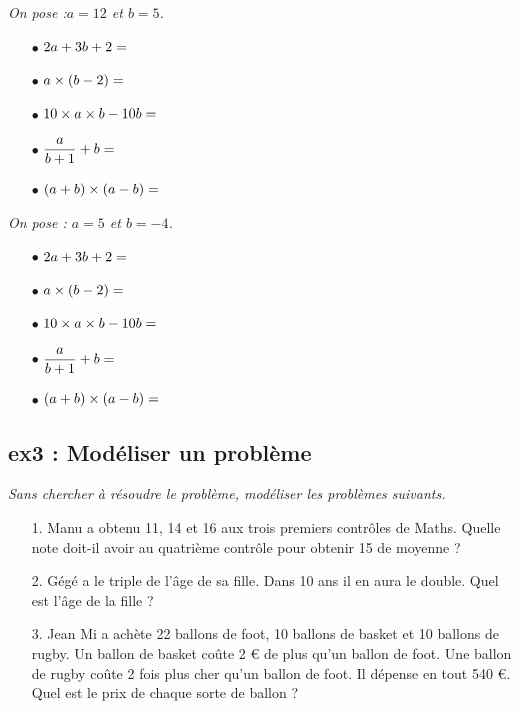 \documentclass[11pt]{article}
\newcommand{\Pointilles}[1][3]{%
  \multido{}{#1}{\makebox[\linewidth]{\dotfill}\\[\parskip]
}}
\begin{document}
\begin{multicols}{2}
\textit{On pose :$a = 12$ et $b = 5$. }

\begin{itemize}
  \item[$\bullet$] $2a + 3b + 2 = \dotfill$
  \item[$\bullet$] $a \times (b - 2) = \dotfill$
  \item[$\bullet$] $10 \times a \times b - 10b = \dotfill$
  \item[$\bullet$] $\dfrac{a}{b + 1} + b = \dotfill$
  \item[$\bullet$] $(a + b) \times (a - b) = \dotfill$
\end{itemize}

\columnbreak

\textit{On pose : $a = 5$ et $b = -4$.}

\begin{itemize}
  \item[$\bullet$] $2a + 3b + 2 = \dotfill$
  \item[$\bullet$] $a \times (b - 2) = \dotfill$
  \item[$\bullet$] $10 \times a \times b - 10b = \dotfill$
  \item[$\bullet$] $\dfrac{a}{b + 1} + b = \dotfill$
  \item[$\bullet$] $(a + b) \times (a - b) = \dotfill$     
\end{itemize}
\end{multicols}
\subsection*{ex3 : Modéliser un problème}
\textit{Sans chercher à résoudre le problème, modéliser les problèmes suivants.}

\begin{multicols}{2}
\begin{enumerate}
  \item[1.] Manu a obtenu 11, 14 et 16 aux trois premiers contrôles de Maths. Quelle note doit-il avoir au quatrième contrôle pour obtenir 15 de moyenne ?
  \item[2.] Gégé a le triple de l’âge de sa fille. Dans 10 ans il en aura le double. Quel est l’âge de la fille ?
  \item[3.] Jean Mi a achète 22 ballons de foot, 10 ballons de basket et 10 ballons de rugby. Un ballon de basket coûte 2 € de plus qu’un ballon de foot. Une ballon de rugby coûte 2 fois plus cher qu'un ballon de foot.  Il dépense en tout 540 €. Quel est le prix de chaque sorte de ballon ?
\end{enumerate}
\columnbreak
\Pointilles[24] 
\end{multicols}
\newpage
\end{document}
